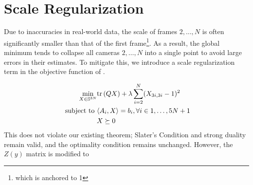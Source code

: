 
\section{Scale Regularization}
\label{app:scale-regularization}

Due to inaccuracies in real-world data, the scale of frames $2,\dots,N$ is often significantly smaller than that of the first frame\footnote{which is anchored to 1}. As a result, the global minimum tends to collapse all cameras $2,\dots,N$ into a single point to avoid large errors in their estimates. To mitigate this, we introduce a scale regularization term in the objective function of .  

\begin{align}\label{eq:problem-sdp-scale}
    \min_{X \in \mathbb{S}^{3N}} & \mathrm{tr}\left(QX\right) + \lambda \sum_{i=2}^{N} (X_{3i,3i}-1)^2 \nonumber\\
    \text{ subject to } & \langle A_i,X \rangle = b_i, \forall i \in 1,\dots,5N+1\nonumber\\
    & X \succeq 0
\end{align}
This does not violate our existing theorem; Slater’s Condition and strong duality remain valid, and the optimality condition remains unchanged. However, the $Z(y)$ matrix is modified to  

